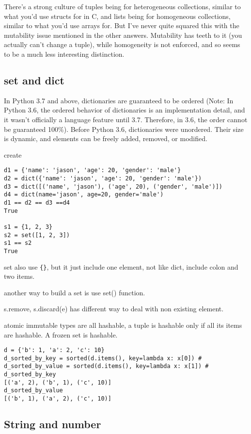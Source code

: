 \documentclass[a4paper,12pt,twoside]{book}
\begin{document}
There's a strong culture of tuples being for heterogeneous collections, similar to what you'd use structs for in C, and lists being for homogeneous collections, similar to what you'd use arrays for. But I've never quite squared this with the mutability issue mentioned in the other answers. Mutability has teeth to it (you actually can't change a tuple), while homogeneity is not enforced, and so seems to be a much less interesting distinction.

\subsection{set and dict}

In Python 3.7 and above, dictionaries are guaranteed to be ordered (Note: In Python 3.6, the ordered behavior of dictionaries is an implementation detail, and it wasn’t officially a language feature until 3.7. Therefore, in 3.6, the order cannot be guaranteed 100\%). Before Python 3.6, dictionaries were unordered. Their size is dynamic, and elements can be freely added, removed, or modified.

create 
\begin{lstlisting}
d1 = {'name': 'jason', 'age': 20, 'gender': 'male'}
d2 = dict({'name': 'jason', 'age': 20, 'gender': 'male'})
d3 = dict([('name', 'jason'), ('age', 20), ('gender', 'male')])
d4 = dict(name='jason', age=20, gender='male') 
d1 == d2 == d3 ==d4
True

s1 = {1, 2, 3}
s2 = set([1, 2, 3])
s1 == s2
True
\end{lstlisting}

	set also use \verb|{}|, but it just include one element, not like dict, include colon and two items. 
	
	
	another way to build a set is use set() function. 
	
	s.remove, s.discard(e) has different way to deal with non existing element. 


atomic immutable types are all hashable, a tuple is hashable only if all its items are hashable. A frozen set is hashable. 

\begin{lstlisting}
d = {'b': 1, 'a': 2, 'c': 10}
d_sorted_by_key = sorted(d.items(), key=lambda x: x[0]) # 
d_sorted_by_value = sorted(d.items(), key=lambda x: x[1]) # 
d_sorted_by_key
[('a', 2), ('b', 1), ('c', 10)]
d_sorted_by_value
[('b', 1), ('a', 2), ('c', 10)]
\end{lstlisting}

\subsection{String and number}
\end{document}
